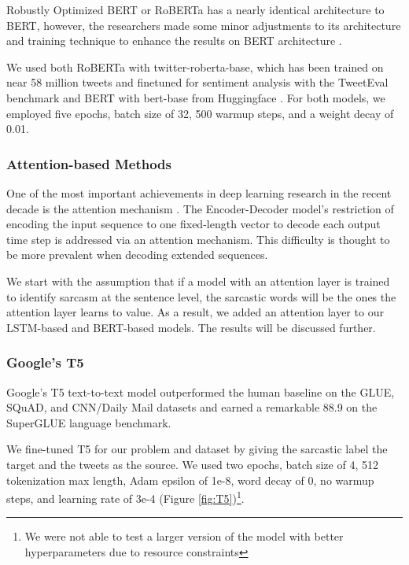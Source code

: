 \documentclass[11pt]{article}
\begin{document}
Robustly Optimized BERT or RoBERTa has a nearly identical architecture to BERT, however, the researchers made some minor adjustments to its architecture and training technique to enhance the results on BERT architecture \cite{liu2019roberta}.

We used both RoBERTa with twitter-roberta-base, which has been trained on near 58 million tweets and finetuned for sentiment analysis with the TweetEval benchmark and BERT with bert-base from Huggingface \cite{wolf2019huggingface}. For both models, we employed five epochs, batch size of 32, 500 warmup steps, and a weight decay of 0.01.

\subsubsection{Attention-based Methods}

One of the most important achievements in deep learning research in the recent decade is the attention mechanism \cite{vaswani2017attention}. The Encoder-Decoder model's restriction of encoding the input sequence to one fixed-length vector to decode each output time step is addressed via an attention mechanism. This difficulty is thought to be more prevalent when decoding extended sequences.

We start with the assumption that if a model with an attention layer is trained to identify sarcasm at the sentence level, the sarcastic words will be the ones the attention layer learns to value. As a result, we added an attention layer to our LSTM-based and BERT-based models. The results will be discussed further.

\subsubsection{Google's T5}

Google's T5 \cite{raffel2019exploring} text-to-text model outperformed the human baseline on the GLUE, SQuAD, and CNN/Daily Mail datasets and earned a remarkable 88.9 on the SuperGLUE language benchmark.

We fine-tuned T5 for our problem and dataset by giving the sarcastic label the target and the tweets as the source. We used two epochs, batch size of 4, 512 tokenization max length, Adam epsilon of 1e-8, word decay of 0, no warmup steps, and learning rate of 3e-4 (Figure \ref{fig:T5})\footnote{We were not able to test a larger version of the model with better hyperparameters due to resource constraints}.
\end{document}
